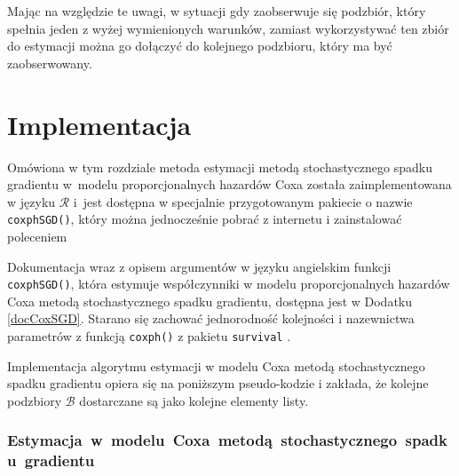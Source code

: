 Mając na względzie te uwagi, w sytuacji gdy zaobserwuje się podzbiór, który spełnia jeden z wyżej wymienionych warunków, zamiast wykorzystywać ten zbiór do estymacji można go dołączyć do kolejnego podzbioru, który ma być zaobserwowany.

\newpage
\section{Implementacja}\label{implemento}

Omówiona w tym rozdziale metoda estymacji metodą stochastycznego spadku gradientu w~modelu proporcjonalnych hazardów Coxa została zaimplementowana w języku $\mathcal{R}$ i~jest dostępna w specjalnie przygotowanym pakiecie o nazwie \texttt{coxphSGD()}, który można jednocześnie pobrać z internetu i zainstalować poleceniem
\begin{Shaded}
\begin{Highlighting}[]
\NormalTok{(}\NormalTok{)}
\end{Highlighting}
\end{Shaded}

Dokumentacja wraz z opisem argumentów w języku angielskim funkcji \texttt{coxphSGD()}, która estymuje współczynniki w modelu
proporcjonalnych hazardów Coxa metodą stochastycznego spadku gradientu, dostępna jest w Dodatku \ref{docCoxSGD}.
Starano się zachować jednorodność kolejności i nazewnictwa parametrów z funkcją \texttt{coxph()} z pakietu \texttt{survival} \citep{ther, survival}.

Implementacja algorytmu estymacji w modelu Coxa metodą stochastycznego spadku gradientu opiera się na poniższym pseudo-kodzie i zakłada, że kolejne podzbiory \(\mathcal{B}\) dostarczane są jako kolejne elementy listy.
\subsubsection{Estymacja~w~modelu~Coxa~metodą~stochastycznego~spadku~gradientu}


